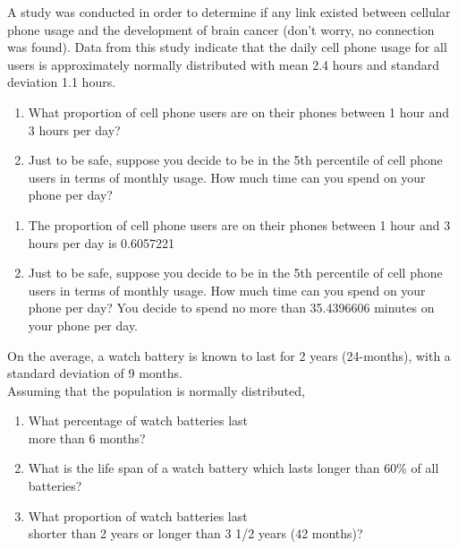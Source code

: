\documentclass[11pt, chapterprefix=true]{scrbook}\usepackage[]{graphicx}\usepackage[]{color}
\begin{document}
\begin{exercises}

  \begin{exercise} %

A study was conducted in order to determine if any link existed between cellular phone usage and the development of brain cancer (don't worry, no connection was found).  Data from this study indicate that the daily cell phone usage for all users is approximately normally distributed with mean 2.4 hours and standard deviation 1.1 hours.

	\begin{enumerate}
	\item What proportion of cell phone users are on their phones between 1 hour
and 3 hours per day?
  \item Just to be safe, suppose you decide to be in the 5th percentile of
cell phone users in terms of monthly usage.  How much time can you spend on your phone per day?
	\end{enumerate}

	\end{exercise}
	\begin{solution}  %


\begin{enumerate}
	\item The proportion of cell phone users are on their phones between 1 hour
and 3 hours per day is 0.6057221
  \item Just to be safe, suppose you decide to be in the 5th percentile of
cell phone users in terms of monthly usage.  How much time can you spend on your phone per day? You decide to spend no more than 35.4396606 minutes on your phone per day.
	\end{enumerate}
	\end{solution}

  \begin{exercise} %

On the average, a watch battery is known to last for 2 years (24-months), with a standard deviation of 9 months.  \\ Assuming that the population is normally distributed,

 \begin{enumerate}
	\item What percentage of watch  batteries  last \\ more than 6 months?
	\item What is the life span of a watch battery which lasts longer than 60\% of all batteries?
	\item What proportion of watch batteries last \\ shorter than 2 years or longer
than 3 1/2 years (42 months)?
 \end{enumerate}


\end{exercise}
\end{exercises}
\end{document}
